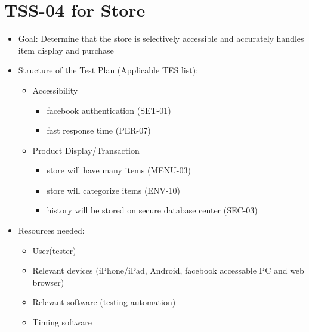 \section{TSS-04 for Store}
\begin{itemize}
\item Goal: Determine that the store is selectively accessible and accurately handles item display and purchase

\item Structure of the Test Plan (Applicable TES list):
\begin{itemize}
\item Accessibility
\begin{itemize}
\item facebook authentication (SET-01)
\item fast response time (PER-07)
\end{itemize}

\item Product Display/Transaction
\begin{itemize}
\item store will have many items (MENU-03)
\item store will categorize items (ENV-10)
\item history will be stored on secure database center (SEC-03)
\end{itemize}
\end{itemize}

\item Resources needed:
\begin{itemize}
\item User(tester)
\item Relevant devices (iPhone/iPad, Android, facebook accessable PC and web browser)
\item Relevant software (testing automation)
\item Timing software
\end{itemize}
\end{itemize}


